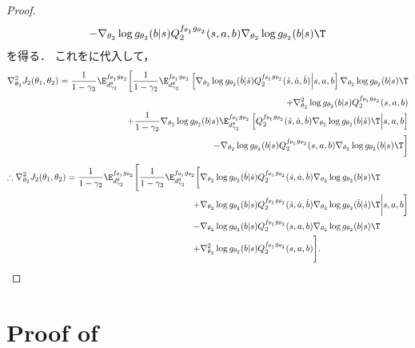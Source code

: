 \documentclass[a4paper,10pt,dvipdfmx]{jsarticle}
\begin{document}
\begin{proof}
\begin{multline}
        -\nabla_{\theta_2}\log g_{\theta_2}(b|s)Q_2^{f_{\theta_1}g_{\theta_2}}(s,a,b)\nabla_{\theta_2}\log g_{\theta_2}(b|s)\T
    \end{multline}
    を得る．
    これをに代入して，
    \begin{align}
        \nabla_{\theta_2}^2J_2(\theta_1,\theta_2)
        =\dfrac{1}{1-\gamma_2}\E_{d_{\gamma_2}^{\theta}}^{f_{\theta_1}g_{\theta_2}}\bigg[\dfrac{1}{1-\gamma_2}\E_{d_{\gamma_2}^{\theta}}^{f_{\theta_1}g_{\theta_2}}\left[\nabla_{\theta_2}\log g_{\theta_2}(\dot{b}|\dot{s})Q_2^{f_{\theta_1}g_{\theta_2}}(\dot{s},\dot{a},\dot{b})\middle|s,a,b\right]\nabla_{\theta_2}\log g_{\theta_2}(b|s)\T\nonumber\\
        +\nabla_{\theta_2}^2\log g_{\theta_2}(b|s)Q_2^{f_{\theta_1}g_{\theta_2}}(s,a,b)\nonumber\\
        +\dfrac{1}{1-\gamma_2}\nabla_{\theta_2}\log g_{\theta_2}(b|s)\E_{d_{\gamma_2}^{\theta}}^{f_{\theta_1}g_{\theta_2}}\left[Q_2^{f_{\theta_1}g_{\theta_2}}(\dot{s},\dot{a},\dot{b})\nabla_{\theta_2}\log g_{\theta_2}(\dot{b}|\dot{s})\T\middle|s,a,b\right]\nonumber\\
        -\nabla_{\theta_2}\log g_{\theta_2}(b|s)Q_2^{f_{\theta_1}g_{\theta_2}}(s,a,b)\nabla_{\theta_2}\log g_{\theta_2}(b|s)\T
        \bigg]
    \end{align}
    \begin{align}
        \therefore\nabla_{\theta_2}^2J_2(\theta_1,\theta_2)=\dfrac{1}{1-\gamma_2}\E_{d_{\gamma_2}^{\theta}}^{f_{\theta_1}g_{\theta_2}}\Bigg[\dfrac{1}{1-\gamma_2}\E_{d_{\gamma_2}^{\theta}}^{f_{\theta_1}g_{\theta_2}}\bigg[&\nabla_{\theta_2}\log g_{\theta_2}(\dot{b}|\dot{s})Q_2^{f_{\theta_1}g_{\theta_2}}(\dot{s},\dot{a},\dot{b})\nabla_{\theta_2}\log g_{\theta_2}(b|s)\T\nonumber\\
        +&\nabla_{\theta_2}\log g_{\theta_2}(b|s)Q_2^{f_{\theta_1}g_{\theta_2}}(\dot{s},\dot{a},\dot{b})\nabla_{\theta_2}\log g_{\theta_2}(\dot{b}|\dot{s})\T\bigg|s,a,b\bigg]\nonumber\\
        -&\nabla_{\theta_2}\log g_{\theta_2}(b|s)Q_2^{f_{\theta_1}g_{\theta_2}}(s,a,b)\nabla_{\theta_2}\log g_{\theta_2}(b|s)\T\nonumber\\
        +&\nabla_{\theta_2}^2\log g_{\theta_2}(b|s)Q_2^{f_{\theta_1}g_{\theta_2}}(s,a,b)\Bigg].
    \end{align}
\end{proof}


\section{Proof of }\label{sec:proof_SPG_qr_1}
\end{document}
